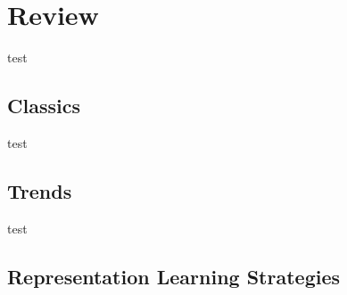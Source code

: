 \chapter{Review}
test
\section{Classics}
test
\section{Trends}
test
\section{Representation Learning Strategies}